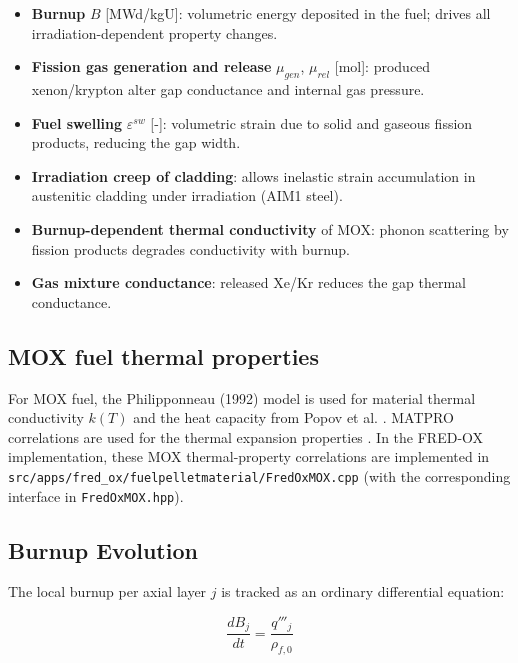 \begin{refsection}
\begin{itemize}
\item \textbf{Burnup} $B$ [MWd/kgU]: volumetric energy deposited in the fuel; drives all irradiation-dependent property changes.
\item \textbf{Fission gas generation and release} $\mu_{gen}$, $\mu_{rel}$ [mol]: produced xenon/krypton alter gap conductance and internal gas pressure.
\item \textbf{Fuel swelling} $\varepsilon^{sw}$ [-]: volumetric strain due to solid and gaseous fission products, reducing the gap width.
\item \textbf{Irradiation creep of cladding}: allows inelastic strain accumulation in austenitic cladding under irradiation (AIM1 steel).
\item \textbf{Burnup-dependent thermal conductivity} of MOX: phonon scattering by fission products degrades conductivity with burnup.
\item \textbf{Gas mixture conductance}: released Xe/Kr reduces the gap thermal conductance.
\end{itemize}

\subsection{MOX fuel thermal properties}
\label{sec:mox_correlations} For MOX fuel, the Philipponneau (1992) model is used for material thermal conductivity $k(T)$ \cite{philipponneau1992} and the  heat capacity from Popov et al. \cite{popov2000}. MATPRO correlations are used for the thermal expansion properties \cite{hagrman1981}. In the FRED-OX implementation, these MOX thermal-property correlations are implemented in \texttt{src/apps/fred\_ox/fuelpelletmaterial/FredOxMOX.cpp} (with the corresponding interface in \texttt{FredOxMOX.hpp}).

\subsection{Burnup Evolution}
\label{sec:burnup}

The local burnup per axial layer $j$ is tracked as an ordinary differential equation:

\begin{equation}
  \frac{dB_j}{dt} = \frac{q'''_j}{\rho_{f,0}}
  \label{eq:burnup_ode}
\end{equation}


\end{refsection}

